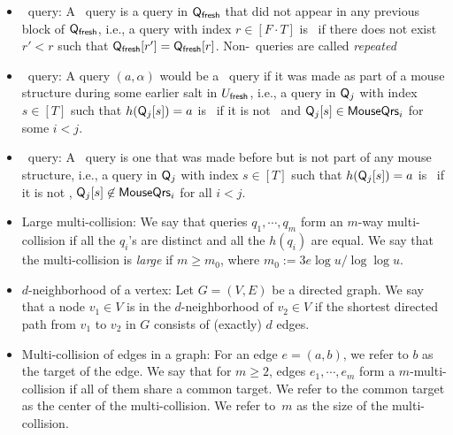 \begin{itemize}
    \item \new\ query: A \new\ query is a query in $\mathsf{Q}_\textsf{fresh}$ that did not appear in any previous block of $\mathsf{Q}_\textsf{fresh}$, i.e., a query with index $r\in [F\cdot T]$ is \new\ if there does not exist $r'<r$ such that $\mathsf{Q}_\textsf{fresh}[r']=\mathsf{Q}_\textsf{fresh}[r]$. 
    Non-\new\ queries are called \emph{repeated}
    \item \frep\ query: A query $(a,\alpha)$ would be a \frep\ query if it was made as part of a mouse structure during some earlier salt in $U_\textsf{fresh}$, i.e., a query in $\mathsf{Q}_j$ with index $s\in [T]$ such that $h(\mathsf{Q}_j[s])=a$ is \frep\ if it is not \new\ and $\mathsf{Q}_j[s]\in \mathsf{MouseQrs}_i$ for some $i<j$.
    \item \urep\ query: A \urep\ query is one that was made before but is not part of any mouse structure, i.e., a query in $\mathsf{Q}_j$ with index $s\in [T]$ such that $h(\mathsf{Q}_j[s])=a$ is  \urep\  if it is not \new, $\mathsf{Q}_j[s]\not\in \mathsf{MouseQrs}_i$ for all $i<j$.
    \item Large multi-collision: We say that queries $q_1,\cdots,q_m$ form an $m$-way multi-collision if all the $q_i$'s are distinct and all the $h(q_i)$ are equal. %
    We say that the multi-collision is \emph{large} if $m\geq m_0$, where $m_0:=3e\log u/ \log \log u $. %
    \item $d$-neighborhood of a vertex: Let $G=(V,E)$ be  a directed graph. We say that a node $v_1\in V$ is in the $d$-neighborhood of $v_2\in V$ if the shortest directed path from $v_1$ to $v_2$ in $G$ consists of (exactly) $d$ edges.
    \item Multi-collision of edges in a graph: 
        For an edge $e=(a,b)$, we refer to $b$ as the target of the edge.
        We say that for $m\geq 2$, edges $e_1,\cdots,e_m$ form a $m$-multi-collision if all of them share a common target. We refer to the common target as the center of the multi-collision. We refer to~$m$ as the size of the multi-collision.
\end{itemize}



